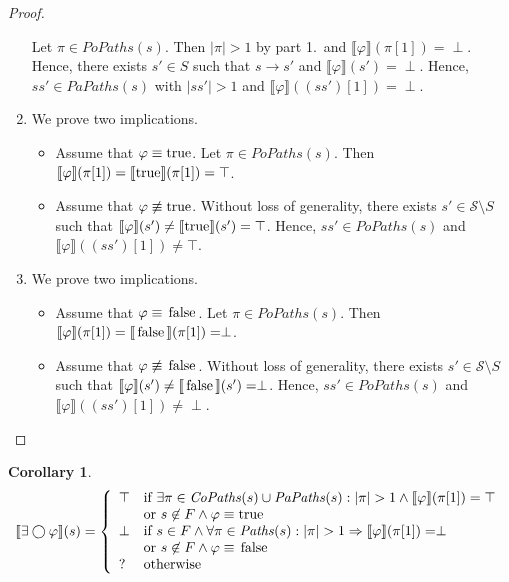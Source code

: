 \documentclass[12pt]{article}
\newcommand{\nxt}{\bigcirc}
\newcommand{\TRUE}{\mbox{\lstinline{true}}}
\newcommand{\FALSE}{\mbox{\lstinline{false}}}
\newtheorem{corollary}{Corollary}
\theoremstyle{definition}
\newcommand{\satisfaction}[1]{\llbracket #1 \rrbracket}
\newenvironment{franck}{\color{red}}{\color{black}}
\begin{document}
\begin{franck}
\begin{proof}
\begin{enumerate}
\[\]
Let $\pi \in \mathit{PoPaths}(s)$.  Then $|\pi| > 1$ by part 1.\ and $\satisfaction{\varphi}(\pi[1]) = \perp$.  Hence, there exists $s' \in S$ such that $s \rightarrow s'$ and $\satisfaction{\varphi}(s') = \perp$.  Hence, $s s' \in \mathit{PaPaths}(s)$ with $|s s'| > 1$ and $\satisfaction{\varphi}((s s')[1]) = \perp$.
\item
We prove two implications.
\begin{itemize}
\item 
Assume that $\varphi \equiv \TRUE$.  Let $\pi \in \mathit{PoPaths}(s)$.  Then $\satisfaction{\varphi}(\pi[1]) = \satisfaction{\TRUE}(\pi[1]) = \top$.
\item
Assume that $\varphi \not\equiv \TRUE$.  Without loss of generality, there exists $s' \in \mathcal{S} \setminus S$ such that $\satisfaction{\varphi}(s') \not= \satisfaction{\TRUE}(s') = \top$.  Hence, $s s' \in \mathit{PoPaths}(s)$ and $\satisfaction{\varphi}((s s')[1]) \not= \top$.
\end{itemize}
\item
We prove two implications.
\begin{itemize}
\item 
Assume that $\varphi \equiv \FALSE$.  Let $\pi \in \mathit{PoPaths}(s)$.  Then $\satisfaction{\varphi}(\pi[1]) = \satisfaction{\FALSE}(\pi[1]) = \perp$.
\item
Assume that $\varphi \not\equiv \FALSE$.  Without loss of generality, there exists $s' \in \mathcal{S} \setminus S$ such that $\satisfaction{\varphi}(s') \not= \satisfaction{\FALSE}(s') = \perp$.  Hence, $s s' \in \mathit{PoPaths}(s)$ and $\satisfaction{\varphi}((s s')[1]) \not= \perp$.
\end{itemize}
\end{enumerate}
\end{proof}

\begin{corollary}
\[
\satisfaction{\exists \nxt \varphi}(s) = \left \{
\begin{array}{ll}
\top & \mbox{if $\exists \pi \in \mathit{CoPaths}(s) \cup \mathit{PaPaths}(s) : |\pi| > 1 \wedge \satisfaction{\varphi}(\pi[1]) = \top$}\\
& \mbox{or $s \not\in F \wedge \varphi \equiv \TRUE$}\\
\perp & \mbox{if $s \in F \wedge \forall \pi \in \mathit{Paths}(s) : |\pi| > 1 \Rightarrow \satisfaction{\varphi}(\pi[1]) = \perp$}\\
& \mbox{or $s \not\in F \wedge \varphi \equiv \FALSE$}\\
? & \mbox{otherwise}
\end{array}
\right .
\]
\end{corollary}


\end{franck}
\end{document}
